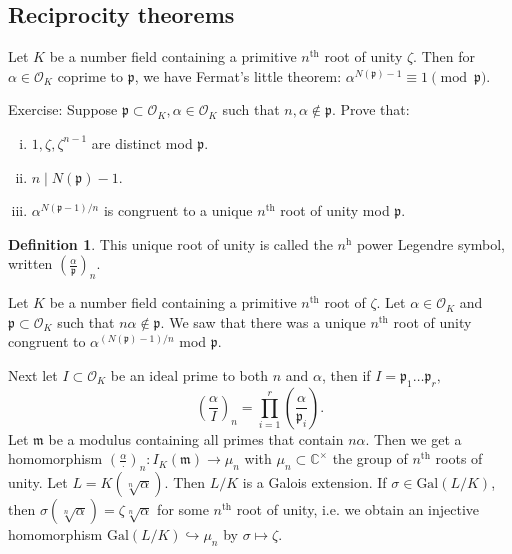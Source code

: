 \documentclass{article}
\theoremstyle{definition}
\newtheorem{defn}{Definition}[section]
\begin{document}
\subsection{Reciprocity theorems}
Let $K$ be a number field containing a primitive $n^{\text{th}}$ root of unity $\zeta$. Then for $\alpha \in \mathcal{O}_K$ coprime to $\mathfrak{p}$, we have Fermat's little theorem: $\alpha^{N(\mathfrak{p})-1} \equiv 1 \pmod{\mathfrak{p}}$.
\vspace{1mm}
 
Exercise: Suppose $\mathfrak{p} \subset \mathcal{O}_K, \alpha \in \mathcal{O}_K$ such that $n, \alpha \not\in \mathfrak{p}$. Prove that:
\begin{enumerate}[(i)]
    \item $1, \zeta,\zeta^{n-1}$ are distinct mod $\mathfrak{p}$.
    \item $n \mid N(\mathfrak{p})-1$.
    \item $\alpha^{N(\mathfrak{p}-1)/n}$ is congruent to a unique $n^{\text{th}}$ root of unity mod $\mathfrak{p}$.
\end{enumerate} 
\begin{defn}
    This unique root of unity is called the $n^{\text{h}}$ power Legendre symbol, written $\left(\frac{\alpha}{\mathfrak{p}}\right)_n$.
\end{defn}
Let $K$ be a number field containing a primitive $n^{\text{th}}$ root of $\zeta$. Let $\alpha \in \mathcal{O}_K$ and $\mathfrak{p} \subset \mathcal{O}_K$ such that $n \alpha \not\in \mathfrak{p}$. We saw that there was a unique $n^{\text{th}}$ root of unity congruent to $\alpha^{(N(\mathfrak{p})-1)/n}$ mod $\mathfrak{p}$.
\vspace{1mm}
 
Next let $I \subset \mathcal{O}_K$ be an ideal prime to both $n$ and $\alpha$, then if $I = \mathfrak{p}_1\ldots \mathfrak{p}_r, $\[
\left(\frac{\alpha}{I}\right)_n = \prod_{i=1}^{r} \left(\frac{\alpha}{\mathfrak{p}_i}\right).
\]
Let $\mathfrak{m}$ be a modulus containing all primes that contain $n \alpha$. Then we get a homomorphism $\left(\frac{\alpha}{\cdot }\right)_{n} : I_K(\mathfrak{m}) \to  \mu_n$ with $\mu_n \subset \mathbb{C}^\times$ the group of $n^{\text{th}}$ roots of unity. Let $L = K(\sqrt[n]{\alpha})$. Then $L/K$ is a Galois extension. If $\sigma \in \text{Gal}(L/K)$, then $\sigma(\sqrt[n]{\alpha}) = \zeta \sqrt[n]{\alpha}$ for some $n^{\text{th}}$ root of unity, i.e. we obtain an injective homomorphism $\text{Gal}(L/K) \hookrightarrow \mu_n$ by $\sigma \mapsto \zeta$.
\vspace{1mm}
 
\end{document}
